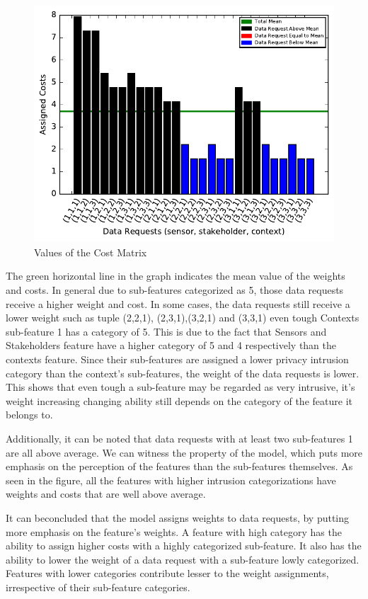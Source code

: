 \begin{figure}[ht!]
\centering
\includegraphics[width=\textwidth,keepaspectratio]{./images/cost_4}
\caption{Values of the Cost Matrix \label{cost}}
\end{figure}

The green horizontal line in the graph indicates the mean value of the weights and costs. In general due to sub-features categorized as 5, those data requests receive a higher weight and cost. In some cases, the data requests still receive a lower weight such as tuple (2,2,1),
(2,3,1),(3,2,1) and (3,3,1) even tough Contexts sub-feature 1 has a category of 5. This is due to the fact that Sensors  and Stakeholders feature have a higher category of 5 and 4 respectively than the contexts feature. Since their sub-features are assigned a lower privacy intrusion category than the context's sub-features, the weight of the data requests is lower. This shows that even tough a sub-feature may be regarded as very intrusive, it's weight increasing changing ability still depends on the category of the feature it belongs to.

Additionally, it can be noted that data requests with at least two sub-features 1 are all above average. We can witness the property of the model, which puts more emphasis on the perception of the features than the sub-features themselves. As seen in the figure, all the features with higher intrusion categorizations have weights and costs that are well above average.

It can  beconcluded that the model assigns weights to data requests, by putting more emphasis on the feature's weights. A feature with high category
has the ability to assign higher costs with a highly categorized sub-feature. It also has the ability to lower the weight of a data request with a sub-feature lowly
categorized. Features with lower categories contribute lesser to the weight assignments, irrespective of their sub-feature categories.







